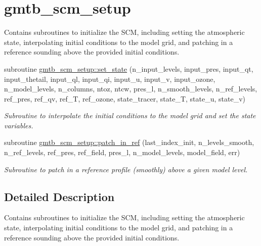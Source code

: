 \hypertarget{group__setup}{}\section{gmtb\+\_\+scm\+\_\+setup}
\label{group__setup}


Contains subroutines to initialize the S\+CM, including setting the atmospheric state, interpolating initial conditions to the model grid, and patching in a reference sounding above the provided initial conditions.  


\begin{DoxyCompactItemize}
\item 
subroutine \hyperlink{group__setup_ga7a3fc65081b77cb24cc8fd62f8b57432}{gmtb\+\_\+scm\+\_\+setup\+::set\+\_\+state} (n\+\_\+input\+\_\+levels, input\+\_\+pres, input\+\_\+qt, input\+\_\+thetail, input\+\_\+ql, input\+\_\+qi, input\+\_\+u, input\+\_\+v, input\+\_\+ozone,   n\+\_\+model\+\_\+levels, n\+\_\+columns, ntoz, ntcw, pres\+\_\+l, n\+\_\+smooth\+\_\+levels, n\+\_\+ref\+\_\+levels, ref\+\_\+pres, ref\+\_\+qv, ref\+\_\+T, ref\+\_\+ozone, state\+\_\+tracer,   state\+\_\+T, state\+\_\+u, state\+\_\+v)
\begin{DoxyCompactList}\small\item\em Subroutine to interpolate the initial conditions to the model grid and set the state variables. \end{DoxyCompactList}\end{DoxyCompactItemize}
\begin{DoxyCompactItemize}
\item 
subroutine \hyperlink{group__setup_gaee18a724335044e0c91ab74cd01a832c}{gmtb\+\_\+scm\+\_\+setup\+::patch\+\_\+in\+\_\+ref} (last\+\_\+index\+\_\+init, n\+\_\+levels\+\_\+smooth, n\+\_\+ref\+\_\+levels, ref\+\_\+pres, ref\+\_\+field, pres\+\_\+l, n\+\_\+model\+\_\+levels, model\+\_\+field,   err)
\begin{DoxyCompactList}\small\item\em Subroutine to patch in a reference profile (smoothly) above a given model level. \end{DoxyCompactList}\end{DoxyCompactItemize}


\subsection{Detailed Description}
Contains subroutines to initialize the S\+CM, including setting the atmospheric state, interpolating initial conditions to the model grid, and patching in a reference sounding above the provided initial conditions. 



